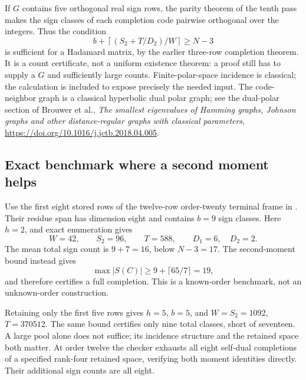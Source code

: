 If $G$ contains five orthogonal real sign rows, the parity theorem
of the tenth pass makes the sign classes of each completion code
pairwise orthogonal over the integers. Thus the condition
\[
 b+\left\lceil(S_2+T/D_2)/W\right\rceil\ge N-3
\]
is sufficient for a Hadamard matrix, by the earlier three-row
completion theorem. It is a count certificate, not a uniform
existence theorem: a proof still has to supply a $G$ and sufficiently
large counts. Finite-polar-space incidence is classical; the
calculation is included to expose precisely the needed input.
The code-neighbor graph is a classical hyperbolic dual polar graph;
see the dual-polar section of Brouwer et al.,
\emph{The smallest eigenvalues of Hamming graphs, Johnson graphs and
other distance-regular graphs with classical parameters},
\url{https://doi.org/10.1016/j.jctb.2018.04.005}.


\subsection{Exact benchmark where a second moment helps}
Use the first eight stored rows of the twelve-row order-twenty
terminal frame in
. Their residue span has
dimension eight and contains $b=9$ sign classes. Here $h=2$, and
exact enumeration gives
\[
 W=42,\qquad S_2=96,\qquad T=588,\qquad D_1=6,\quad D_2=2.
\]
The mean total sign count is $9+7=16$, below $N-3=17$.
The second-moment bound instead gives
\[
 \max |S(C)|\ge9+\lceil65/7\rceil=19,
\]
and therefore certifies a full completion. This is a known-order
benchmark, not an unknown-order construction.

Retaining only the first five rows gives $h=5$, $b=5$, and
$W=S_2=1092$, $T=370512$. The same bound certifies only nine total
classes, short of seventeen. A large pool alone does not suffice;
its incidence structure and the retained space both matter.
At order twelve the checker exhausts all eight self-dual completions
of a specified rank-four retained space, verifying both moment
identities directly. Their additional sign counts are all eight.

